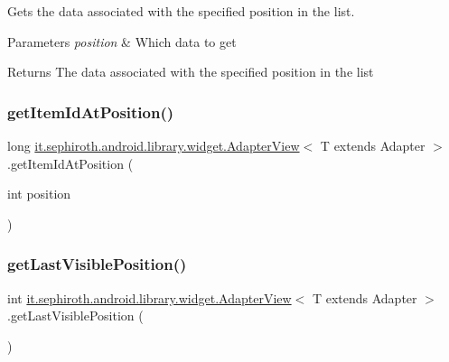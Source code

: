 Gets the data associated with the specified position in the list.


\begin{DoxyParams}{Parameters}
{\em position} & Which data to get \\
\hline
\end{DoxyParams}
\begin{DoxyReturn}{Returns}
The data associated with the specified position in the list 
\end{DoxyReturn}
\mbox{\label{classit_1_1sephiroth_1_1android_1_1library_1_1widget_1_1_adapter_view_a8db15c5d1782366d1439f73f1a3d9e13}} 
\subsubsection{\texorpdfstring{get\+Item\+Id\+At\+Position()}{getItemIdAtPosition()}}
{\footnotesize\ttfamily long \hyperlink{classit_1_1sephiroth_1_1android_1_1library_1_1widget_1_1_adapter_view}{it.\+sephiroth.\+android.\+library.\+widget.\+Adapter\+View}$<$ T extends Adapter $>$.get\+Item\+Id\+At\+Position (\begin{DoxyParamCaption}\item[{int}]{position }\end{DoxyParamCaption})}

\mbox{\label{classit_1_1sephiroth_1_1android_1_1library_1_1widget_1_1_adapter_view_a6daccb03d7b64550e42c1bd0291eafad}} 
\subsubsection{\texorpdfstring{get\+Last\+Visible\+Position()}{getLastVisiblePosition()}}
{\footnotesize\ttfamily int \hyperlink{classit_1_1sephiroth_1_1android_1_1library_1_1widget_1_1_adapter_view}{it.\+sephiroth.\+android.\+library.\+widget.\+Adapter\+View}$<$ T extends Adapter $>$.get\+Last\+Visible\+Position (\begin{DoxyParamCaption}{ }\end{DoxyParamCaption})}

